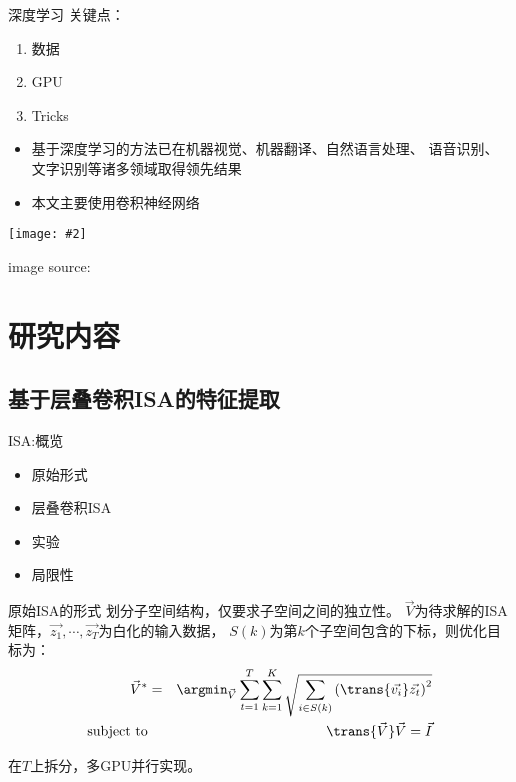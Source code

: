 \documentclass {beamer}
\newcommand{\addgraph}[2]{\begin{center}
\texttt{[image: \#2]}\end{center}}
\begin{document}
\begin{frame}{深度学习}
    关键点：
    \begin{enumerate}
        \item 数据
        \item GPU
        \item Tricks
    \end{enumerate}
    \pause
    \begin{itemize}
        \item 基于深度学习的方法已在机器视觉、机器翻译、自然语言处理、
            语音识别、文字识别等诸多领域取得领先结果
        \item 本文主要使用卷积神经网络
    \end{itemize}
    \addgraph{0.5}{res/alexnet.png}
    \tiny{image source: \cite{krizhevsky2012imagenet}}
\end{frame}


\section{研究内容}
\subsection{基于层叠卷积ISA的特征提取}
\begin{frame}{ISA:概览}
    \begin{itemize}
        \item 原始形式
        \item 层叠卷积ISA
        \item 实验
        \item 局限性
    \end{itemize}
\end{frame}

\begin{frame}{原始ISA的形式}
    划分子空间结构，仅要求子空间之间的独立性。
    $\vec{V}$为待求解的ISA矩阵，$\vec{z_1},\cdots,\vec{z_T}$为白化的输入数据，
    $S(k)$为第$k$个子空间包含的下标，则优化目标为：
    \begin{eqnarray}
        \vec{V}^* &=& \argmin_{\vec{V}} \sum_{t=1}^T \sum_{k=1}^K
        \sqrt{\sum_{i\in S(k)}\left(\trans{\vec{v_i}}\vec{z_t}\right)^2}
        \nonumber \\
        \text{subject to} && \trans{\vec{V}}\vec{V}=\vec{I}
        \label{eqn:isa:1}
    \end{eqnarray}


     {
        \vspace{1em}
        在$T$上拆分，多GPU并行实现。
    }
\end{frame}
\end{document}
